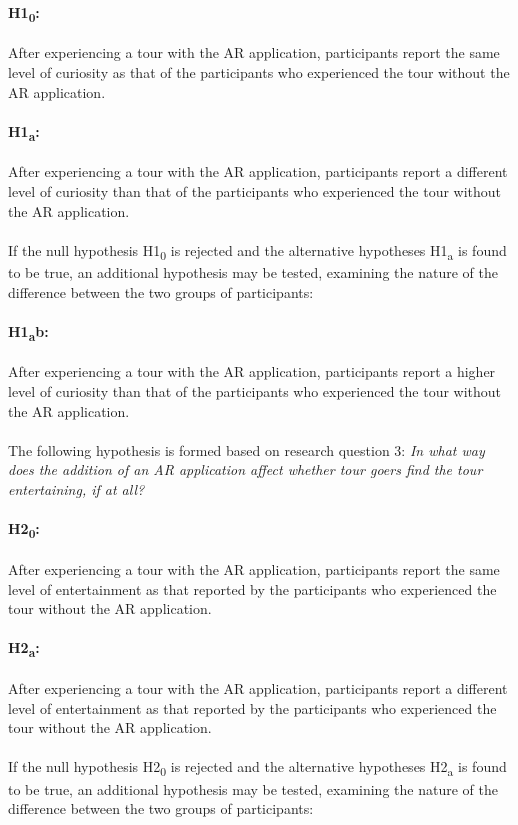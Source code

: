 \paragraph{H1\textsubscript{0}:} After experiencing a tour with the AR application, participants report the same level of curiosity as that of the participants who experienced the tour without the AR application.

\paragraph{H1\textsubscript{a}:}  After experiencing a tour with the AR application, participants report a different level of curiosity than that of the participants who experienced the tour without the AR application.\\
\\
If the null hypothesis H1\textsubscript{0} is rejected and the alternative hypotheses H1\textsubscript{a} is found to be true, an additional hypothesis may be tested, examining the nature of the difference between the two groups of participants:

\paragraph{H1\textsubscript{a}b:} After experiencing a tour with the AR application, participants report a higher level of curiosity than that of the participants who experienced the tour without the AR application.\\
\\
The following hypothesis is formed based on research question 3: \textit{In what way does the addition of an AR application affect whether tour goers find the tour entertaining, if at all?}

\paragraph{H2\textsubscript{0}:} After experiencing a tour with the AR application, participants report the same level of entertainment as that reported by the participants who experienced the tour without the AR application.

\paragraph{H2\textsubscript{a}:} After experiencing a tour with the AR application, participants report a different level of entertainment as that reported by the participants who experienced the tour without the AR application.\\
\\
If the null hypothesis H2\textsubscript{0} is rejected and the alternative hypotheses H2\textsubscript{a} is found to be true, an additional hypothesis may be tested, examining the nature of the difference between the two groups of participants:

